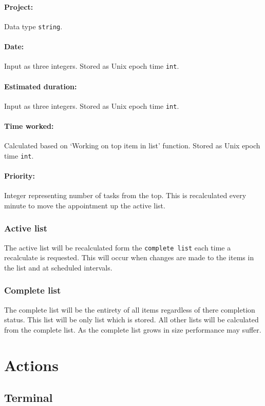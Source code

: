 \documentclass[12pt]{article}
\newcommand{\e}[1] {{\tt #1}}
\begin{document}
\paragraph{Project:} Data type \e{string}.
\paragraph{Date:} Input as three integers. Stored as Unix epoch time \e{int}.
\paragraph{Estimated duration:} Input as three integers. Stored as Unix epoch time \e{int}.
\paragraph{Time worked:} Calculated based on `Working on top item in list' function. Stored as Unix epoch time \e{int}. 
\paragraph{Priority:} Integer representing number of tasks from the top. This is recalculated every minute to move the appointment up the active list.

\subsubsection{Active list} \label{sec:Active list}
The active list will be recalculated form the \e{complete list} each time a recalculate is requested.  This will occur when changes are made to the items in the list and at scheduled intervals.

\subsubsection{Complete list} \label{sec:Complete list}
The complete list will be the entirety of all items regardless of there completion status. This list will be only list which is stored. All other lists will be calculated from the complete list.  As the complete list grows in size performance may suffer. 

\section{Actions} \label{sec:Actions}
\subsection{Terminal}
\setcounter{paragraph}{0}
\setcounter{subsubsection}{0}
\end{document}
